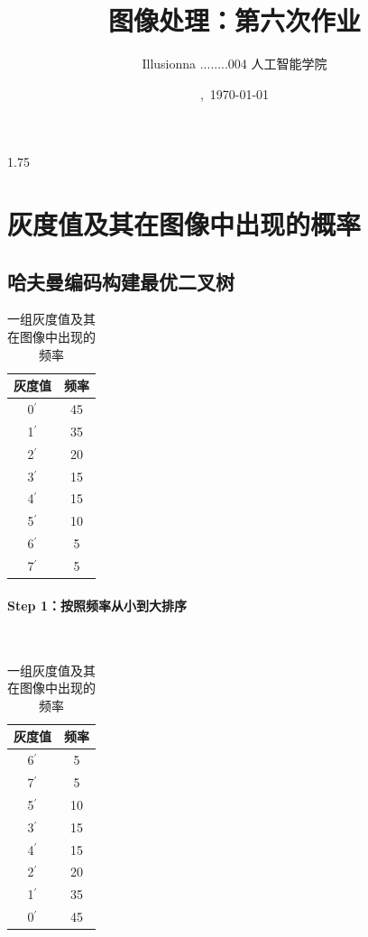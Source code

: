 \documentclass{article}
\title{图像处理：第六次作业}
\author{Illusionna \quad 2025........004 \quad 人工智能学院}
\date{\currenttime,\ \today}
\begin{document}
\maketitle
\begin{spacing}{1.75}
    \tableofcontents
\end{spacing}
\thispagestyle{empty}
\clearpage
\setcounter{page}{1}



\section{灰度值及其在图像中出现的概率}
\subsection{哈夫曼编码构建最优二叉树}
\begin{table}[H]
    \centering
    \setlength{\tabcolsep}{64pt}
    \renewcommand{\arraystretch}{1.2}
    \caption{一组灰度值及其在图像中出现的频率}
    \begin{tabular}{cc}
        \bottomrule[1.5pt]
        灰度值 & 频率 \\
        \midrule[0.75pt]
        0$^{'}$ & 45 \\
        1$^{'}$ & 35 \\
        2$^{'}$ & 20 \\
        3$^{'}$ & 15 \\
        4$^{'}$ & 15 \\
        5$^{'}$ & 10 \\
        6$^{'}$ & 5 \\
        7$^{'}$ & 5 \\
        \toprule[1.5pt]
    \end{tabular}
\end{table}

\paragraph*{Step 1：按照频率从小到大排序}~{}

\begin{table}[H]
    \centering
    \setlength{\tabcolsep}{64pt}
    \renewcommand{\arraystretch}{1.2}
    \caption{一组灰度值及其在图像中出现的频率}
    \begin{tabular}{cc}
        \bottomrule[1.5pt]
        灰度值 & 频率 \\
        \midrule[0.75pt]
        6$^{'}$ & 5 \\
        7$^{'}$ & 5 \\
        5$^{'}$ & 10 \\
        3$^{'}$ & 15 \\
        4$^{'}$ & 15 \\
        2$^{'}$ & 20 \\
        1$^{'}$ & 35 \\
        0$^{'}$ & 45 \\
        \toprule[1.5pt]
    \end{tabular}
\end{table}
\end{document}
